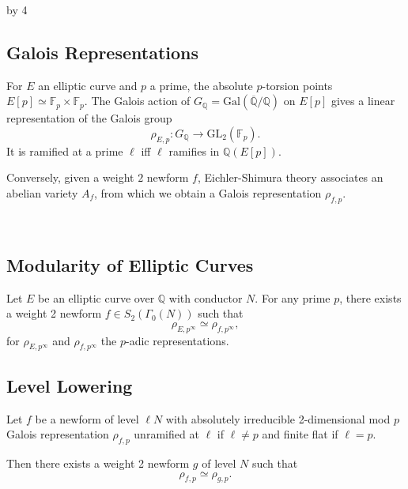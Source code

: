 \documentclass[12pt]{scrartcl}
\def\F{{\mathbb F}}
\def\Q{{\mathbb Q}}
\newcommand{\GL}{\text{GL}}
\renewcommand{\bar}{\overline}
\newcommand{\Gal}{\text{Gal}}
\def\anzspalten{4}
\newlength{\kastenwidth}
\newenvironment{kasten}{%
  \begin{lrbox}{\dummybox}%
    \begin{minipage}{0.96\linewidth}}%
    {\end{minipage}%
  \end{lrbox}%
  \raisebox{-\depth}{\psshadowbox[framesep=1em]{\usebox{\dummybox}}}\\[0.5em]}
\newenvironment{spalte}{%
  \setlength\kastenwidth{1.2\textwidth}
  \divide\kastenwidth by \anzspalten
  \begin{minipage}[t]{\kastenwidth}}{\end{minipage}\hfill}
\begin{document}
\begin{lrbox}{\spalten}
{\begin{spalte}
\begin{kasten}

\subsection*{\color{blue} Galois Representations}

For $E$ an elliptic curve and $p$ a prime, the absolute $p$-torsion points $E[p] \simeq \F_p \times \F_p$.
The Galois action of $G_\Q = \Gal(\bar{\Q}/\Q)$ on $E[p]$ gives a linear representation of the Galois group 
\[ \rho_{E,p} \colon G_\Q \rightarrow \GL_2(\F_p). \]
It is ramified at a prime $\ell$ iff $\ell$ ramifies in $\Q(E[p])$.  

Conversely, given a weight $2$ newform $f$, Eichler-Shimura theory associates an abelian variety $A_f$, from which we obtain a Galois representation $\rho_{f,p}$.

\end{kasten}



\begin{kasten}

\subsection*{\color{blue} Modularity of Elliptic Curves}

Let $E$ be an elliptic curve over $\Q$ with conductor $N$.  For any prime $p$, there exists a weight 2 newform $f \in S_2(\Gamma_0(N))$ such that
\[ \rho_{E,p^{\infty}} \simeq \rho_{f,p^{\infty}},\]
for $\rho_{E,p^\infty}$ and $\rho_{f,p^\infty}$ the $p$-adic representations. 

\subsection*{\color{blue} Level Lowering}

Let $f$ be a newform of level $\ell N$ with absolutely irreducible 2-dimensional mod $p$ Galois representation $\rho_{f,p}$ unramified at $\ell$ if $\ell \neq p$ and finite flat if $\ell = p$. 

 Then there exists a weight 2 newform $g$ of level $N$ such that
 \vspace{-10pt}
\[ \rho_{f,p} \simeq \rho_{g,p}. \]

\end{kasten}



\end{spalte}}
\end{lrbox}
\end{document}
